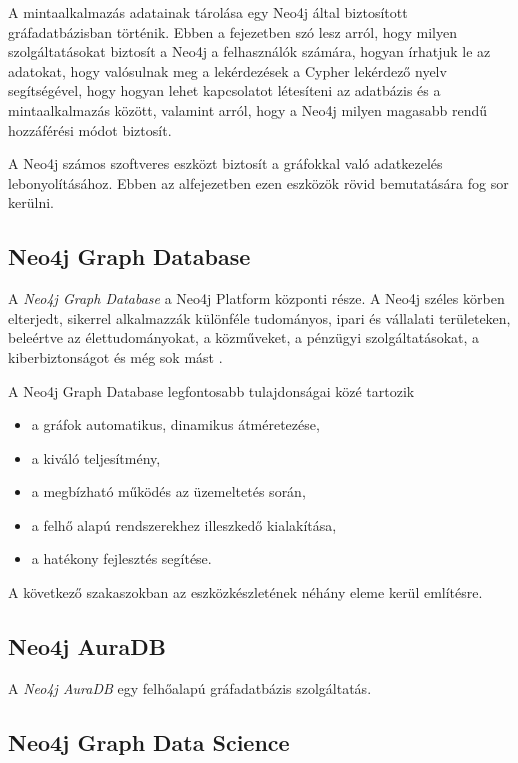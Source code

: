 
A mintaalkalmazás adatainak tárolása egy Neo4j által biztosított gráfadatbázisban történik. Ebben a fejezetben szó lesz arról, hogy milyen szolgáltatásokat biztosít a Neo4j a felhasználók számára, hogyan írhatjuk le az adatokat, hogy valósulnak meg a lekérdezések a Cypher lekérdező nyelv segítségével, hogy hogyan lehet kapcsolatot létesíteni az adatbázis és a mintaalkalmazás között, valamint arról, hogy a Neo4j milyen magasabb rendű hozzáférési módot biztosít.


A Neo4j számos szoftveres eszközt biztosít a gráfokkal való adatkezelés lebonyolításához. Ebben az alfejezetben ezen eszközök rövid bemutatására fog sor kerülni.

\subsection{Neo4j Graph Database}

A \textit{Neo4j Graph Database} a Neo4j Platform központi része. A Neo4j széles körben elterjedt, sikerrel alkalmazzák különféle tudományos, ipari és vállalati területeken, beleértve az élettudományokat, a közműveket, a pénzügyi szolgáltatásokat, a kiberbiztonságot és még sok mást \cite{neo4j-graph-database}.

A Neo4j Graph Database legfontosabb tulajdonságai közé tartozik
\begin{itemize}
      \item a gráfok automatikus, dinamikus átméretezése,
      \item a kiváló teljesítmény,
      \item a megbízható működés az üzemeltetés során,
      \item a felhő alapú rendszerekhez illeszkedő kialakítása, 
      \item a hatékony fejlesztés segítése.
\end{itemize}
A következő szakaszokban az eszközkészletének néhány eleme kerül említésre.

\subsection{Neo4j AuraDB}

A \textit{Neo4j AuraDB} egy felhőalapú gráfadatbázis szolgáltatás. 

\subsection{Neo4j Graph Data Science}

